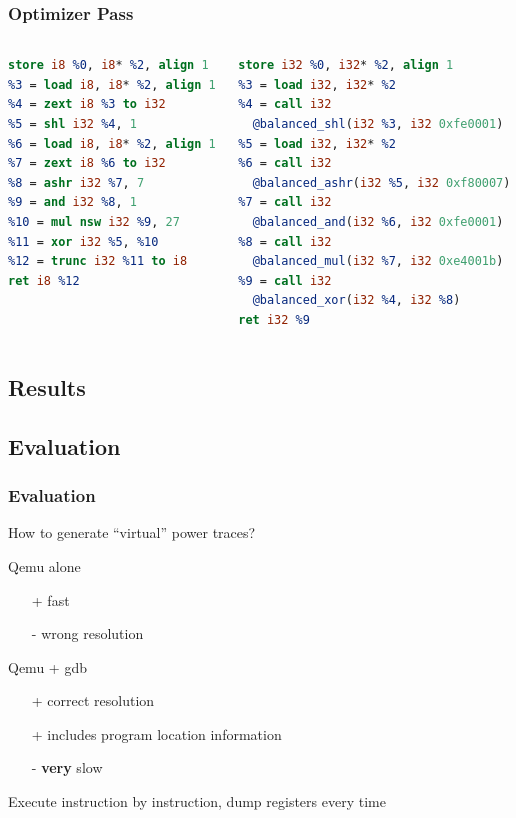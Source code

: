 \documentclass[11pt,t,usepdftitle=false,aspectratio=169]{beamer}
\begin{document}
\begin{frame}[fragile]
  \frametitle{Optimizer Pass}
  \begin{columns}[T]
    \begin{column}{0.4\textwidth}
      \begin{lstlisting}[language=LLVM, basicstyle=\small]
%2 = alloca i8, align 1
store i8 %0, i8* %2, align 1
%3 = load i8, i8* %2, align 1
%4 = zext i8 %3 to i32
%5 = shl i32 %4, 1
%6 = load i8, i8* %2, align 1
%7 = zext i8 %6 to i32
%8 = ashr i32 %7, 7
%9 = and i32 %8, 1
%10 = mul nsw i32 %9, 27
%11 = xor i32 %5, %10
%12 = trunc i32 %11 to i8
ret i8 %12
      \end{lstlisting}
    \end{column}
    \vrule
    \hfill
    \begin{column}{0.48\textwidth}
      \begin{lstlisting}[language=LLVM, basicstyle=\small]
%2 = alloca i32
store i32 %0, i32* %2, align 1
%3 = load i32, i32* %2
%4 = call i32
  @balanced_shl(i32 %3, i32 0xfe0001)
%5 = load i32, i32* %2
%6 = call i32
  @balanced_ashr(i32 %5, i32 0xf80007)
%7 = call i32
  @balanced_and(i32 %6, i32 0xfe0001)
%8 = call i32
  @balanced_mul(i32 %7, i32 0xe4001b)
%9 = call i32
  @balanced_xor(i32 %4, i32 %8)
ret i32 %9
      \end{lstlisting}
    \end{column}
  \end{columns}
\end{frame}

\subsection{Results}


\subsection{Evaluation}
\begin{frame}
  \frametitle{Evaluation}

  How to generate ``virtual'' power traces?
  
  \begin{block}{Qemu alone}
    \begin{itemize}
    \item[+] fast
    \item[-] wrong resolution
    \end{itemize}
  \end{block}

  \begin{alertblock}{Qemu + gdb}
    \begin{itemize}
    \item[+] correct resolution
    \item[+] includes program location information
    \item[-] \textbf{very} slow
    \end{itemize}
    Execute instruction by instruction, dump registers every time
  \end{alertblock}
\end{frame}
\end{document}

